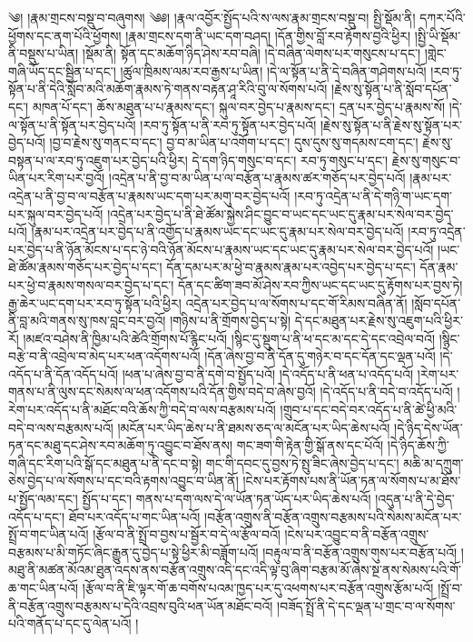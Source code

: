 ༄། །རྣམ་གྲངས་བསྡུ་བ་བཞུགས། ༄༅། །རྣལ་འབྱོར་སྤྱོད་པའི་ས་ལས་རྣམ་གྲངས་བསྡུ་བ། སྤྱི་སྡོམ་ནི། དཀར་པོའི་ཕྱོགས་དང་ནག་པོའི་ཕྱོགས། །རྣམ་གྲངས་དག་ནི་ཡང་དག་བཤད། །དོན་གྱིས་བློ་རབ་རྟོགས་བྱའི་ཕྱིར། །སྤྱི་ཡི་སྡོམ་ནི་བསྡུས་པ་ཡིན། །སྡོམ་ནི། སྟོན་དང་མཆོག་ཉིད་ཤེས་རབ་བཞི། །དེ་བཞིན་ལེགས་པར་གསུངས་པ་དང་། །གླེང་གཞི་ཡོད་དང་སྦྱིན་པ་དང་། །ཚུལ་ཁྲིམས་ལམ་རབ་རྒྱས་པ་ཡིན། །དེ་ལ་སྟོན་པ་ནི་དེ་བཞིན་གཤེགས་པའོ། །རབ་ཏུ་སྟོན་པ་ནི་དེའི་སློབ་མའི་མཆོག་རྣམས་ཏེ་གནས་བརྟན་ཤཱ་རིའི་བུ་ལ་སོགས་པའོ། །རྗེས་སུ་སྟོན་པ་ནི་སློབ་དཔོན་དང་། མཁན་པོ་དང་། ཆོས་མཐུན་པ་པ་རྣམས་དང་། སྐུལ་བར་བྱེད་པ་རྣམས་དང་། དྲན་པར་བྱེད་པ་རྣམས་སོ། །དེ་ལ་སྟོན་པ་ནི་སྟོན་པར་བྱེད་པའོ། །རབ་ཏུ་སྟོན་པ་ནི་རབ་ཏུ་སྟོན་པར་བྱེད་པའོ། །རྗེས་སུ་སྟོན་པ་ནི་རྗེས་སུ་སྟོན་པར་བྱེད་པའོ། །བྱ་བ་རྗེས་སུ་གནང་བ་དང་། བྱ་བ་མ་ཡིན་པ་འགོག་པ་དང་། དུས་དུས་སུ་གདམས་ངག་དང་། རྗེས་སུ་བསྟན་པ་ལ་རབ་ཏུ་འཇུག་པར་བྱེད་པའི་ཕྱིར། དེ་དག་ཉིད་གསུང་བ་དང་། རབ་ཏུ་གསུང་པ་དང་། རྗེས་སུ་གསུང་བ་ཡིན་པར་རིག་པར་བྱའོ། །འདྲེན་པ་ནི་བྱ་བ་མ་ཡིན་པ་ལ་བརྩོན་པ་རྣམས་ཚར་གཅོད་པར་བྱེད་པའོ། །རྣམ་པར་འདྲེན་པ་ནི་བྱ་བ་ལ་བརྩོན་པ་རྣམས་ཡང་དག་པར་མགུ་བར་བྱེད་པའོ། །རབ་ཏུ་འདྲེན་པ་ནི་དེ་གཉི་ག་ཡང་དག་པར་སྐུལ་བར་བྱེད་པའོ། །འདྲེན་པར་བྱེད་པ་ནི་ཐེ་ཚོམ་སྐྱེས་ཤིང་བྱུང་བ་ཡང་དང་ཡང་དུ་རྣམ་པར་སེལ་བར་བྱེད་པའོ། །རྣམ་པར་འདྲེན་པར་བྱེད་པ་ནི་འགྱོད་པ་རྣམས་ཡང་དང་ཡང་དུ་རྣམ་པར་སེལ་བར་བྱེད་པའོ། །རབ་ཏུ་འདྲེན་པར་བྱེད་པ་ནི་ཉོན་མོངས་པ་དང་ཉེ་བའི་ཉོན་མོངས་པ་རྣམས་ཡང་དང་ཡང་དུ་རྣམ་པར་སེལ་བར་བྱེད་པའོ། །ཡང་ཐེ་ཚོམ་རྣམས་གཅོད་པར་བྱེད་པ་དང་། དོན་དམ་པར་མ་ཕྱེ་བ་རྣམས་རྣམ་པར་འབྱེད་པར་བྱེད་པ་དང་། དོན་རྣམ་པར་ཕྱེ་བ་རྣམས་གསལ་བར་བྱེད་པ་དང་། དོན་དང་ཚིག་ཟབ་མོ་ཤེས་རབ་ཀྱིས་ཡང་དང་ཡང་དུ་རྟོགས་པར་བྱས་ཏེ། རྒྱ་ཆེར་ཡང་དག་པར་རབ་ཏུ་སྟོན་པའི་ཕྱིར། འདྲེན་པར་བྱེད་པ་ལ་སོགས་པ་དང་གོ་རིམས་བཞིན་ནོ། །སློབ་དཔོན་ནི་བླ་མའི་གནས་སུ་ཁས་བླང་བར་བྱའོ། །གཉིས་པ་ནི་གྲོགས་བྱེད་པ་སྟེ། དེ་དང་མཐུན་པར་རྗེས་སུ་འཇུག་པའི་ཕྱིར་རོ། །མཛའ་བཤེས་ནི་ཁྱིམ་པའི་ཚེའི་གྲོགས་པོ་རྙིང་པའོ། །སྙིང་དུ་སྡུག་པ་ནི་ཕ་དང་མ་དང་དེ་དང་འབྲེལ་བའོ། །སྙིང་བརྩེ་བ་ནི་འབྲེལ་བ་མེད་པར་ཕན་འདོགས་པའོ། །དོན་ཞེས་བྱ་བ་ནི་དོན་དུ་གཉེར་བ་དང་དོན་དང་ལྡན་པའོ། །དེ་འདོད་པ་ནི་དོན་འདོད་པའོ། །ཕན་པ་ཞེས་བྱ་བ་ནི་དགེ་བ་སྤྱོད་པའོ། །དེ་འདོད་པ་ནི་ཕན་པ་འདོད་པའོ། །རེག་པར་གནས་པ་ནི་ལུས་དང་སེམས་ལ་ཕན་འདོགས་པའི་དོན་གྱིས་བདེ་བ་ཞེས་བྱའོ། །དེ་འདོད་པ་ནི་བདེ་བ་འདོད་པའོ། །རེག་པར་འདོད་པ་ནི་མཐོང་བའི་ཆོས་ཀྱི་བདེ་བ་ལས་བརྩམས་པའོ། །གྲུབ་པ་དང་བདེ་བར་འདོད་པ་ནི་ཚེ་ཕྱི་མའི་བདེ་བ་ལས་བརྩམས་པའོ། །མངོན་པར་ཡིད་ཆེས་པ་ནི་ཐམས་ཅད་ལ་མངོན་པར་ཡིད་ཆེས་པའོ། །དེ་ཉིད་དེས་ཡོན་ཏན་དང་མཐུ་དང་ཤེས་རབ་མཆོག་ཏུ་འབྱུང་བ་ཐོས་ནས། གང་ཟག་གི་རྟེན་གྱི་སྒོ་ནས་དང་པོའོ། །དེ་ཉིད་ཆོས་ཀྱི་གཞི་དང་རིག་པའི་སྒོ་དང་མཐུན་པ་ནི་དང་བ་སྟེ། གང་གི་དབང་དུ་བྱས་ཏེ་སྤུ་ཟིང་ཞེས་བྱེད་པ་དང་། མཆི་མ་དཀྲུག་ཅེས་བྱེད་པ་ལ་སོགས་པ་དང་བའི་རྟགས་འབྱུང་བ་ཡིན་ནོ། །ངེས་པར་རྟོགས་པས་ནི་ཡོན་ཏན་ལ་སོགས་པ་མ་ཐོས་པ་སྤྱོད་ལམ་དང་། སྤྱོད་པ་དང་། གནས་པ་དག་ལས་དེ་ལ་ཡོན་ཏན་ཡོད་པར་ཡིད་ཆེས་པའོ། །འདུན་པ་ནི་དེ་བྱེད་འདོད་པ་དང་། ཐོབ་པར་འདོད་པ་གང་ཡིན་པའོ། །བརྩོན་འགྲུས་ནི་བརྩོན་འགྲུས་བརྩམས་པའི་སེམས་མངོན་པར་སྤྲོ་བ་གང་ཡིན་པའོ། །རྩོལ་བ་ནི་སྤྲོ་བ་བྱས་པ་སྦྱོར་བ་དེ་ལ་རྩོལ་བའོ། །ངེས་པར་འབྱུང་བ་ནི་བརྩོན་འགྲུས་བརྩམས་པ་མི་གཏོང་ཞིང་རྒྱུན་དུ་བྱེད་པ་སྟེ་ཕྱིར་མི་བཟློག་པའོ། །བརྟུལ་བ་ནི་བརྩོན་འགྲུས་གུས་པར་བརྩོན་པའོ། །མཐུ་ནི་མཚན་མོའམ་ཐུན་འདས་ནས་བརྩོན་འགྲུས་འདི་དང་འདི་ལྟ་བུ་ཞིག་བརྩམ་མོ་ཞེས་སྔ་ནས་སེམས་པའི་གོ་ཆ་གང་ཡིན་པའོ། །རྩོལ་བ་ནི་ཇི་ལྟར་གོ་ཆ་བགོས་པའམ་ཁྱད་པར་དུ་འཕགས་པར་བརྩོན་འགྲུས་རྩོམ་པའོ། །སྤྲོ་བ་ནི་བརྩོན་འགྲུས་བརྩམས་པ་དེའི་འབྲས་བུའི་ཕན་ཡོན་མཐོང་བའོ། །བཟོད་སྤྲོ་ནི་དེ་དང་ལྡན་པ་གྲང་བ་ལ་སོགས་པའི་གནོད་པ་དང་དུ་ལེན་པའོ། །
